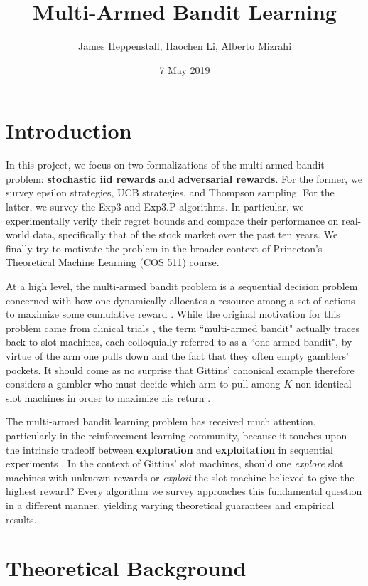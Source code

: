 \documentclass[12pt]{article}
\title{Multi-Armed Bandit Learning}
\author{James Heppenstall, Haochen Li, Alberto Mizrahi}
\date{7 May 2019}
\begin{document}
\maketitle

\section{Introduction}

In this project, we focus on two formalizations of the multi-armed bandit problem: \textbf{stochastic iid rewards} and \textbf{adversarial rewards}. For the former, we survey epsilon strategies, UCB strategies, and Thompson sampling. For the latter, we survey the Exp3 and Exp3.P algorithms. In particular, we experimentally verify their regret bounds and compare their performance on real-world data, specifically that of the stock market over the past ten years. We finally try to motivate the problem in the broader context of Princeton's Theoretical Machine Learning (COS 511) course.

At a high level, the multi-armed bandit problem is a sequential decision problem concerned with how one dynamically allocates a resource among a set of actions to maximize some cumulative reward \cite{robbins1952}. While the original motivation for this problem came from clinical trials \cite{thompson1933}, the term ``multi-armed bandit" actually traces back to slot machines, each colloquially referred to as a ``one-armed bandit", by virtue of the arm one pulls down and the fact that they often empty gamblers' pockets. It should come as no surprise that Gittins' canonical example therefore considers a gambler who must decide which arm to pull among $K$ non-identical slot machines in order to maximize his return \cite{gittins1979}.

The multi-armed bandit learning problem has received much attention, particularly in the reinforcement learning community, because it touches upon the intrinsic tradeoff between \textbf{exploration} and \textbf{exploitation} in sequential experiments \cite{bubeck2012}. In the context of Gittins' slot machines, should one \textit{explore} slot machines with unknown rewards or \textit{exploit} the slot machine believed to give the highest reward? Every algorithm we survey approaches this fundamental question in a different manner, yielding varying theoretical guarantees and empirical results.

\section{Theoretical Background}
\end{document}
